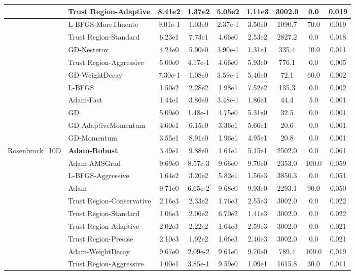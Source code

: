 \documentclass[10pt]{article}
\begin{document}
\begin{longtable}{|l|l|c|c|c|c|c|c|c|}
\hline
 & Trust Region-Adaptive & 8.41e2 & 1.37e2 & 5.05e2 & 1.11e3 & 3002.0 & 0.0 & 0.019 \\
\hline
 & L-BFGS-MoreThuente & 9.01e-1 & 1.03e0 & 2.37e-1 & 3.50e0 & 1090.7 & 70.0 & 0.019 \\
\hline
 & Trust Region-Standard & 6.23e1 & 7.73e1 & 4.66e0 & 2.53e2 & 2827.2 & 0.0 & 0.018 \\
\hline
 & GD-Nesterov & 4.24e0 & 5.00e0 & 3.90e-1 & 1.31e1 & 335.4 & 10.0 & 0.011 \\
\hline
 & Trust Region-Aggressive & 5.00e0 & 4.17e-1 & 4.66e0 & 5.93e0 & 776.1 & 0.0 & 0.005 \\
\hline
 & GD-WeightDecay & 7.30e-1 & 1.08e0 & 3.59e-1 & 5.40e0 & 72.1 & 60.0 & 0.002 \\
\hline
 & L-BFGS & 1.50e2 & 2.28e2 & 1.98e1 & 7.52e2 & 135.3 & 0.0 & 0.002 \\
\hline
 & Adam-Fast & 1.44e1 & 3.86e0 & 3.48e-1 & 1.86e1 & 44.4 & 5.0 & 0.001 \\
\hline
 & GD & 5.09e0 & 1.48e-1 & 4.75e0 & 5.31e0 & 32.5 & 0.0 & 0.001 \\
\hline
 & GD-AdaptiveMomentum & 4.60e1 & 6.15e0 & 3.36e1 & 5.66e1 & 20.6 & 0.0 & 0.001 \\
\hline
 & GD-Momentum & 3.55e1 & 8.91e0 & 1.96e1 & 4.95e1 & 20.8 & 0.0 & 0.001 \\
Rosenbrock\_10D & \textbf{Adam-Robust} & 3.49e1 & 9.88e0 & 1.61e1 & 5.15e1 & 2502.0 & 0.0 & 0.061 \\
\hline
 & Adam-AMSGrad & 9.69e0 & 8.57e-3 & 9.66e0 & 9.70e0 & 2353.0 & 100.0 & 0.059 \\
\hline
 & L-BFGS-Aggressive & 1.64e2 & 3.20e2 & 5.82e1 & 1.56e3 & 3850.3 & 0.0 & 0.051 \\
\hline
 & Adam & 9.71e0 & 6.65e-2 & 9.68e0 & 9.93e0 & 2293.1 & 90.0 & 0.050 \\
\hline
 & Trust Region-Conservative & 2.16e3 & 2.33e2 & 1.76e3 & 2.55e3 & 3002.0 & 0.0 & 0.022 \\
\hline
 & Trust Region-Standard & 1.06e3 & 2.06e2 & 6.70e2 & 1.41e3 & 3002.0 & 0.0 & 0.022 \\
\hline
 & Trust Region-Adaptive & 2.02e3 & 2.22e2 & 1.64e3 & 2.59e3 & 3002.0 & 0.0 & 0.021 \\
\hline
 & Trust Region-Precise & 2.10e3 & 1.92e2 & 1.66e3 & 2.46e3 & 3002.0 & 0.0 & 0.021 \\
\hline
 & Adam-WeightDecay & 9.67e0 & 2.09e-2 & 9.61e0 & 9.70e0 & 789.4 & 100.0 & 0.019 \\
\hline
 & Trust Region-Aggressive & 1.00e1 & 3.85e-1 & 9.59e0 & 1.09e1 & 1615.8 & 30.0 & 0.011 \\

\end{longtable}
\end{document}
